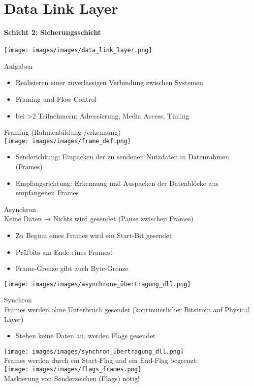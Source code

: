 \section{Data Link Layer}
\paragraph{Schicht 2: Sicherungsschicht}
\texttt{[image: images/images/data\_link\_layer.png]}
\begin{definition}{Aufgaben}
    \begin{itemize}
        \item Realisieren einer zuverlässigen Verbindung zwischen Systemen
        \item Framing und Flow Control
        \item bei >2 Teilnehmern: Adressierung, Media Access, Timing
    \end{itemize}
\end{definition}

\begin{definition}{Framing (Rahmenbildung-/erkennung)}\\
    \texttt{[image: images/images/frame\_def.png]}
    \begin{itemize}
        \item Senderichtung: Einpacken der zu sendenen Nutzdaten in Datenrahmen (Frames)
        \item Empfangsrichtung: Erkennung und Auspacken der Datenblöcke aus empfangenen Frames
    \end{itemize}
\end{definition}

\begin{concept}{Asynchron}\\
    Keine Daten → Nichts wird gesendet (Pause zwischen Frames)
    \begin{itemize}
        \item Zu Beginn eines Frames wird ein Start-Bit gesendet
        \item Prüfbits am Ende eines Frames!
        \item Frame-Grenze gibt auch Byte-Grenze
    \end{itemize}
    \texttt{[image: images/images/asynchrone\_übertragung\_dll.png]}
\end{concept}

\begin{concept}{Synchron}\\
    Frames werden ohne Unterbruch gesendet (kontinuierlicher Bitstrom auf Physical Layer)
    \begin{itemize}
        \item Stehen keine Daten an, werden Flags gesendet
    \end{itemize}
    \texttt{[image: images/images/synchron\_übertragung\_dll.png]}\\
    Frames werden durch ein Start-Flag und ein End-Flag begrenzt:\\
    \texttt{[image: images/images/flags\_frames.png]}\\
    Maskierung von Sonderzeichen (Flags) nötig!
\end{concept}

